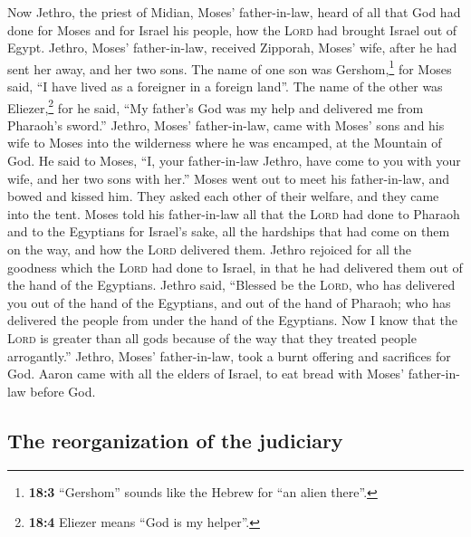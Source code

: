  Now Jethro, the priest of Midian, Moses' father-in-law,
heard of all that God had done for Moses and for Israel his people, how
the \textsc{Lord} had brought Israel out of Egypt. 
Jethro, Moses' father-in-law, received Zipporah, Moses' wife, after he
had sent her away,  and her two sons. The name of one son
was Gershom,\footnote{\textbf{18:3} ``Gershom'' sounds like the Hebrew
  for ``an alien there''.} for Moses said, ``I have lived as a foreigner
in a foreign land''.  The name of the other was
Eliezer,\footnote{\textbf{18:4} Eliezer means ``God is my helper''.} for
he said, ``My father's God was my help and delivered me from Pharaoh's
sword.''  Jethro, Moses' father-in-law, came with Moses'
sons and his wife to Moses into the wilderness where he was encamped, at
the Mountain of God.  He said to Moses, ``I, your
father-in-law Jethro, have come to you with your wife, and her two sons
with her.''  Moses went out to meet his father-in-law, and
bowed and kissed him. They asked each other of their welfare, and they
came into the tent.  Moses told his father-in-law all that
the \textsc{Lord} had done to Pharaoh and to the Egyptians for Israel's
sake, all the hardships that had come on them on the way, and how the
\textsc{Lord} delivered them.  Jethro rejoiced for all the
goodness which the \textsc{Lord} had done to Israel, in that he had
delivered them out of the hand of the Egyptians.  Jethro
said, ``Blessed be the \textsc{Lord}, who has delivered you out of the
hand of the Egyptians, and out of the hand of Pharaoh; who has delivered
the people from under the hand of the Egyptians.  Now I
know that the \textsc{Lord} is greater than all gods because of the way
that they treated people arrogantly.''  Jethro, Moses'
father-in-law, took a burnt offering and sacrifices for God. Aaron came
with all the elders of Israel, to eat bread with Moses' father-in-law
before God.

\hypertarget{the-reorganization-of-the-judiciary}{%
\subsection{The reorganization of the
judiciary}\label{the-reorganization-of-the-judiciary}}


